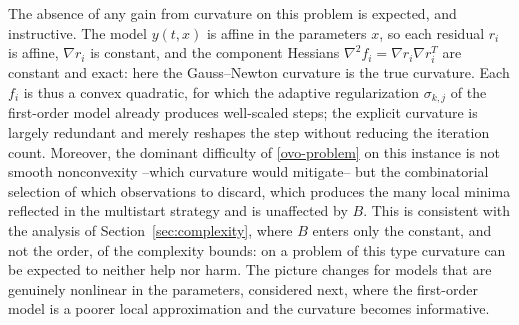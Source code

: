 \documentclass[11pt]{article}
\begin{document}
The absence of any gain from curvature on this problem is expected, and
instructive. The model $y(t,x)$ is affine in the parameters $x$, so each
residual $r_i$ is affine, $\nabla r_i$ is constant, and the component Hessians
$\nabla^2 f_i=\nabla r_i\nabla r_i^T$ are constant and exact: here the
Gauss--Newton curvature is the true curvature. Each $f_i$ is thus a convex
quadratic, for which the adaptive regularization $\sigma_{k,j}$ of the
first-order model already produces well-scaled steps; the explicit curvature is
largely redundant and merely reshapes the step without reducing the iteration
count. Moreover, the dominant difficulty of \eqref{ovo-problem} on this
instance is not smooth nonconvexity --which curvature would mitigate-- but the
combinatorial selection of which observations to discard, which produces the
many local minima reflected in the multistart strategy and is unaffected by
$B$. This is consistent with the analysis of Section~\ref{sec:complexity},
where $B$ enters only the constant, and not the order, of the complexity
bounds: on a problem of this type curvature can be expected to neither help nor
harm. The picture changes for models that are genuinely nonlinear in the
parameters, considered next, where the first-order model is a poorer local
approximation and the curvature becomes informative.

\clearpage
\end{document}
